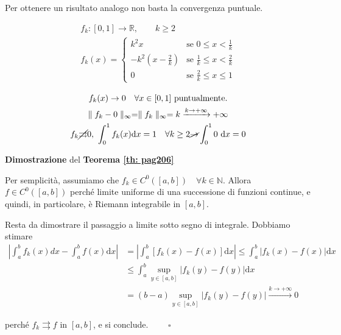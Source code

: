 \begin{attbar}
	Per ottenere un risultato analogo non basta la convergenza puntuale.
\end{attbar}

\begin{gather*}
	f_k:[0,1]\rightarrow\mathbb{R}, \qquad k \geq 2
	\\
	f_k(x) = 
	\begin{cases}
		k^2x &\text{se } 0 \leq x < \frac{1}{k}
		\\
		-k^2 \left(x-\frac{2}{k}\right) & \text{se } \frac{1}{k} \leq x < \frac{2}{k}
		\\
		0 & \text{se } \frac{2}{k} \leq x \leq 1
	\end{cases}
\end{gather*}

\segnaposto %

\begin{gather*} 
	f_k(x) \rightarrow 0 \quad \forall x \in [0,1] \text{ puntualmente.}
	\\
	\parallel f_k-0 \parallel_\infty = \parallel f_k\parallel_\infty=k \xrightarrow{k \rightarrow +\infty} +\infty
	\\
	f_k \cancel{\rightrightarrows} 0, \ \int_{0}^{1} f_k(x) \mathrm{d}x = 1 \quad \forall k \geq 2 \cancel{\rightarrow} \int_{0}^{1} 0 \ \mathrm{d}x = 0
\end{gather*}


\begin{dembar}
	\textbf{Dimostrazione} del \textbf{Teorema \ref{th: pag206}}
	
	Per semplicità, assumiamo che $f_k \in C^0 ([a,b]) \quad \forall k \in \mathbb{N}$. Allora $f\in C^0 ([a,b])$ perché limite uniforme di una successione di funzioni continue, e quindi, in particolare, è Riemann integrabile in $[a,b]$.
	
	Resta da dimostrare il passaggio a limite sotto segno di integrale. Dobbiamo stimare 
	\begin{align*}
		\left| \int_{a}^{b}f_k(x) dx -\int_{a}^{b}f(x) \mathrm{d}x \right|
		&= \left| \int_{a}^{b} [f_k(x)-f(x)] \mathrm{d}x \right| \leq \int_{a}^{b}|f_k(x)-f(x)| \mathrm{d}x
		\\ 
		&\leq \int_{a}^{b}\sup_{y \in [a,b]} |f_k(y)-f(y)| \mathrm{d}x 
		\\
		&= (b-a)\sup_{y \in [a,b]} |f_k(y)-f(y)| \xrightarrow{k \rightarrow+\infty} 0
	\end{align*}
	
	perché $f_k \rightrightarrows f$ in $[a,b]$, e si conclude. $\qquad \square$	
\end{dembar}


